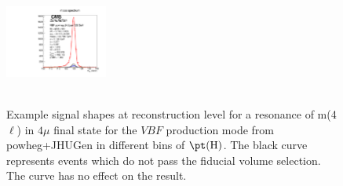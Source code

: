 \begin{figure}[htb]
\begin{center}
{      \includegraphics[width=0.3\textwidth,angle=0]{Figures/Appendix//VBF_powheg_JHUgen_125_4mu_pT4l_genbin4_recobin4_effs_genWeight*pileupWeight*dataMCWeight.pdf}
      \label{fig:sigfits-pT4l-VBF-powheg15-JHUgen-125-maintext:e}
    }
     \\
    \\
    \caption{ Example signal shapes at reconstruction level for a resonance of m(4$\ell$) in $4\mu$ final state for the $VBF$ production mode from {\sc powheg+JHUGen} in different bins of $\pt(\mathrm{H})$. The black curve represents events which do not pass the fiducial volume selection. The curve has no effect on the result.
    }
  \label{fig:sigfits-pT4l-VBF-powheg15-JHUgen-125-maintext}
 \end{center}
\end{figure} \clearpage



